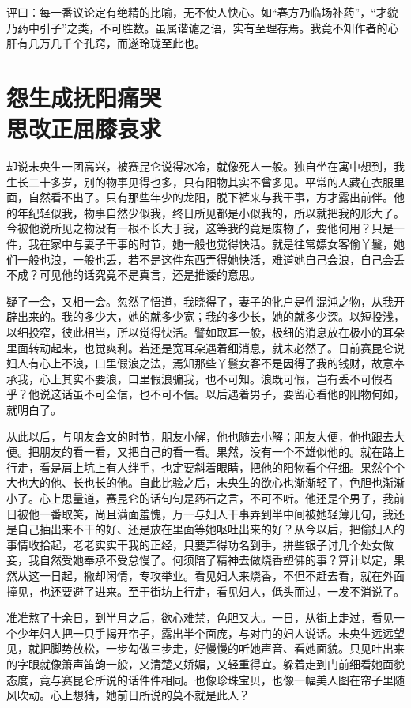 \documentclass[a4paper,12pt,UTF8,twoside]{ctexbook}
\begin{document}
评曰：每一番议论定有绝精的比喻，无不使人快心。如“春方乃临场补药”，“才貌乃药中引子”之类，不可胜数。虽属谐谑之语，实有至理存焉。我竟不知作者的心肝有几万几千个孔窍，而遂玲珑至此也。

\chapter[怨生成抚阳痛哭\ 思改正屈膝哀求]{怨生成抚阳痛哭\\思改正屈膝哀求}

却说未央生一团高兴，被赛昆仑说得冰冷，就像死人一般。独自坐在寓中想到，我生长二十多岁，别的物事见得也多，只有阳物其实不曾多见。平常的人藏在衣服里面，自然看不出了。只有那些年少的龙阳，脱下裤来与我干事，方才露出前伴。他的年纪轻似我，物事自然少似我，终日所见都是小似我的，所以就把我的形大了。今被他说所见之物没有一根不长大于我，这等我的竟是废物了，要他何用？只是一件，我在家中与妻子干事的时节，她一般也觉得快活。就是往常嫖女客偷丫鬟，她们一般也浪，一般也丢，若不是这件东西弄得她快活，难道她自己会浪，自己会丢不成？可见他的话究竟不是真言，还是推诿的意思。

疑了一会，又相一会。忽然了悟道，我晓得了，妻子的牝户是件混沌之物，从我开辟出来的。我的多少大，她的就多少宽；我的多少长，她的就多少深。以短投浅，以细投窄，彼此相当，所以觉得快活。譬如取耳一般，极细的消息放在极小的耳朵里面转动起来，也觉爽利。若还是宽耳朵遇着细消息，就未必然了。日前赛昆仑说妇人有心上不浪，口里假浪之法，焉知那些丫鬟女客不是因得了我的钱财，故意奉承我，心上其实不要浪，口里假浪骗我，也不可知。浪既可假，岂有丢不可假者乎？他说这话虽不可全信，也不可不信。以后遇着男子，要留心看他的阳物何如，就明白了。

从此以后，与朋友会文的时节，朋友小解，他也随去小解；朋友大便，他也跟去大便。把朋友的看一看，又把自己的看一看。果然，没有一个不雄似他的。就在路上行走，看是肩上坑上有人绊手，也定要斜着眼睛，把他的阳物看个仔细。果然个个大也大的他、长也长的他。自此比验之后，未央生的欲心也渐渐轻了，色胆也渐渐小了。心上思量道，赛昆仑的话句句是药石之言，不可不听。他还是个男子，我前日被他一番取笑，尚且满面羞愧，万一与妇人干事弄到半中间被她轻薄几句，我还是自己抽出来不干的好、还是放在里面等她呕吐出来的好？从今以后，把偷妇人的事情收拾起，老老实实干我的正经，只要弄得功名到手，拼些银子讨几个处女做妾，我自然受她奉承不受怠慢了。何须陪了精神去做烧香塑佛的事？算计以定，果然从这一日起，撇却闲情，专攻举业。看见妇人来烧香，不但不赶去看，就在外面撞见，也还要避了进来。至于街坊上行走，看见妇人，低头而过，一发不消说了。

准准熬了十余日，到半月之后，欲心难禁，色胆又大。一日，从街上走过，看见一个少年妇人把一只手揭开帘子，露出半个面庞，与对门的妇人说话。未央生远远望见，就把脚势放松，一步勾做三步走，好慢慢的听她声音、看她面貌。只见吐出来的字眼就像箫声笛韵一般，又清楚又娇媚，又轻重得宜。躲着走到门前细看她面貌态度，竟与赛昆仑所说的话件件相同。也像珍珠宝贝，也像一幅美人图在帘子里随风吹动。心上想猜，她前日所说的莫不就是此人？
\end{document}
